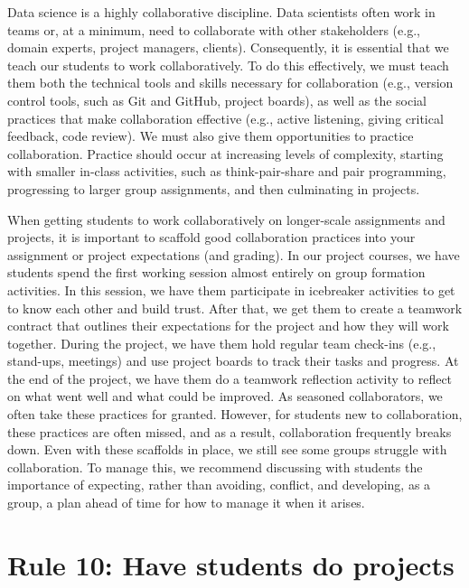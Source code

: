 \documentclass[
  10pt,
  letterpaper,
]{article}
\begin{document}
Data science is a highly collaborative discipline. Data scientists often
work in teams or, at a minimum, need to collaborate with other
stakeholders (e.g., domain experts, project managers, clients).
Consequently, it is essential that we teach our students to work
collaboratively. To do this effectively, we must teach them both the
technical tools and skills necessary for collaboration (e.g., version
control tools, such as Git and GitHub, project boards), as well as the
social practices that make collaboration effective (e.g., active
listening, giving critical feedback, code review). We must also give
them opportunities to practice collaboration. Practice should occur at
increasing levels of complexity, starting with smaller in-class
activities, such as think-pair-share and pair programming, progressing
to larger group assignments, and then culminating in projects.

When getting students to work collaboratively on longer-scale
assignments and projects, it is important to scaffold good collaboration
practices into your assignment or project expectations (and grading). In
our project courses, we have students spend the first working session
almost entirely on group formation activities. In this session, we have
them participate in icebreaker activities to get to know each other and
build trust. After that, we get them to create a teamwork contract that
outlines their expectations for the project and how they will work
together. During the project, we have them hold regular team check-ins
(e.g., stand-ups, meetings) and use project boards to track their tasks
and progress. At the end of the project, we have them do a teamwork
reflection activity to reflect on what went well and what could be
improved. As seasoned collaborators, we often take these practices for
granted. However, for students new to collaboration, these practices are
often missed, and as a result, collaboration frequently breaks down.
Even with these scaffolds in place, we still see some groups struggle
with collaboration. To manage this, we recommend discussing with
students the importance of expecting, rather than avoiding, conflict,
and developing, as a group, a plan ahead of time for how to manage it
when it arises.

\section{Rule 10: Have students do projects}\label{sec-rule10}
\end{document}
